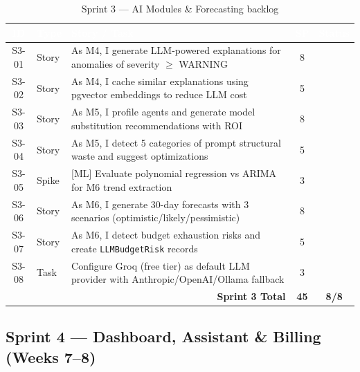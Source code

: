 \documentclass[12pt,a4paper,twoside]{report}
\newcommand{\cmark}{\ding{51}}
\begin{document}
\begin{table}[H]
\centering
\small
\begin{tabularx}{\textwidth}{|c|l|X|c|c|}
\hline
\rowcolor{tabheader}
\textcolor{white}{\textbf{ID}} &
\textcolor{white}{\textbf{Type}} &
\textcolor{white}{\textbf{Story / Task}} &
\textcolor{white}{\textbf{SP}} &
\textcolor{white}{\textbf{Status}} \\
\hline
S3-01 & Story & As M4, I generate LLM-powered explanations for anomalies of severity $\geq$ WARNING & 8 & \cmark \\
\hline
S3-02 & Story & As M4, I cache similar explanations using pgvector embeddings to reduce LLM cost & 5 & \cmark \\
\hline
S3-03 & Story & As M5, I profile agents and generate model substitution recommendations with ROI & 8 & \cmark \\
\hline
S3-04 & Story & As M5, I detect 5 categories of prompt structural waste and suggest optimizations & 5 & \cmark \\
\hline
S3-05 & Spike & \textcolor{accentgreen}{[ML]} Evaluate polynomial regression vs ARIMA for M6 trend extraction & 3 & \cmark \\
\hline
S3-06 & Story & As M6, I generate 30-day forecasts with 3 scenarios (optimistic/likely/pessimistic) & 8 & \cmark \\
\hline
S3-07 & Story & As M6, I detect budget exhaustion risks and create \texttt{LLMBudgetRisk} records & 5 & \cmark \\
\hline
S3-08 & Task & Configure Groq (free tier) as default LLM provider with Anthropic/OpenAI/Ollama fallback & 3 & \cmark \\
\hline
\multicolumn{3}{|r|}{\textbf{Sprint 3 Total}} & \textbf{45} & \textbf{8/8} \\
\hline
\end{tabularx}
\caption{Sprint 3 — AI Modules \& Forecasting backlog}
\end{table}

\subsection{Sprint 4 — Dashboard, Assistant \& Billing (Weeks 7--8)}
\end{document}
